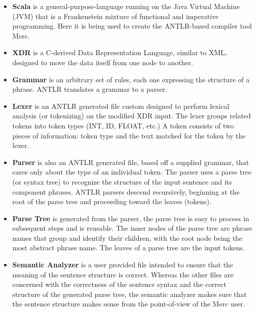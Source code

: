 \begin{itemize}
\item \textbf{Scala} is a general-purpose-language running on the Java Virtual Machine (JVM)
  that is a Frankenstein mixture of functional and imperative programming. Here it is being used
  to create the ANTLR-based compiler tool Merc.

\item \textbf{XDR} is a C-derived Data Representation Language, similar to XML, designed to move
  the data itself from one node to another.

\item \textbf{Grammar} is an arbitrary set of rules, each one expressing the structure of a
  phrase. ANTLR translates a grammar to a parser.

\item \textbf{Lexer} is an ANTLR generated file custom designed to perform lexical analysis (or
  tokenizing) on the modified XDR input. The lexer groups related tokens into token types (INT,
  ID, FLOAT, etc.) A token consists of two pieces of information: token type and the text
  matched for the token by the lexer.

\item \textbf{Parser} is also an ANTLR generated file, based off a supplied grammar, that cares
  only about the type of an individual token. The parser uses a parse tree (or syntax tree) to
  recognize the structure of the input sentence and its component phrases. ANTLR parsers descend
  recursively, beginning at the root of the parse tree and proceeding toward the leaves
  (tokens).

\item \textbf{Parse Tree} is generated from the parser, the parse tree is easy to process in
  subsequent steps and is reusable. The inner nodes of the parse tree are phrase names that
  group and identify their children, with the root node being the most abstract phrase name. The
  leaves of a parse tree are the input tokens.

\item \textbf{Semantic Analyzer} is a user provided file intended to ensure that the meaning of
  the sentence structure is correct. Whereas the other files are concerned with the correctness
  of the sentence syntax and the correct structure of the generated parse tree, the semantic
  analyzer makes sure that the sentence structure makes sense from the point-of-view of the
  Merc user.


\end{itemize}
